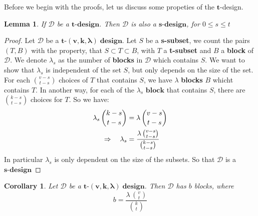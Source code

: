 \documentclass{article}
\newtheorem{lemma}[theorem]{Lemma}
\newtheorem{collary}[theorem]{Corollary}
\numberwithin{equation}{theorem}
\numberwithin{figure}{theorem}
\newcommand{\tCompleteDesign}{\ensuremath{\bm{t\mbox{-}(v,k,\lambda)\; design}}}
\newcommand{\myBlock}{\textbf{block}}
\newcommand{\pluralMyBlock}{\textbf{blocks}}
\newcommand{\xDesign}[1]{\ensuremath{\bm{#1\mbox{-}design}}}
\newcommand{\dDes}{\ensuremath{\mathscr{D}}}
\begin{document}
Before we begin with the proofs, let us discuss some propeties of the $\bm{t}$-design.
\begin{lemma}\label{propTdesign}
If $\mathscr{D}$ be a $\bm{t\mbox{-}design}$. Then $\mathscr{D}$ is also a $\bm{s\mbox{-}design}$, for $0 \leq s \leq t$
\end{lemma}
\begin{proof}
Let $\mathscr{D}$ be a \tCompleteDesign.
Let $S$ be a \textbf{s-subset}, we count the pairs $(T,B)$ with the property, that $S \subset T \subset B$, with $T$ a \textbf{t-subset} and $B$ a \textbf{block} of $\mathscr{D}$. We denote $\lambda_s$ as the number of \textbf{blocks} in $\mathscr{D}$ which contains $S$. We want to show that $\lambda_s$ is independent of the set $S$, but only depends on the size of the set. 
For each $\binom{v-s}{t-s}$ choices of $T$ that contains $S$, we have $\lambda$ {\pluralMyBlock} $B$ whicht contains $T$. In another way, for each of the $\lambda_s$ $\myBlock$ that contains $S$, there are $\binom{k-s}{t-s}$ choices for $T$. So we have:
\begin{align}
	\lambda_s \, \binom{k-s}{t-s} &= \lambda \, \binom{v-s}{t-s} \notag\\
	\Rightarrow  \quad \lambda_s &= \frac{\lambda \, \binom{v-s}{t-s}}{\binom{k-s}{t-s}} \label{sDesign}
\end{align}
In particular $\lambda_s$ is only dependent on the size of the subsets. So that $\mathscr{D}$ is a \xDesign{s}
\end{proof}

\begin{collary}\label{blockCount}
Let {\dDes} be a \tCompleteDesign.
Then {\dDes} has $b$ blocks, where
\[
	b = \frac{\lambda \, \binom{v}{t}}{\binom{k}{t}}
\]
\end{collary}
\end{document}
